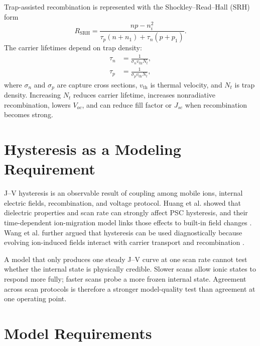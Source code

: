 Trap-assisted recombination is represented with the Shockley--Read--Hall (SRH)
form
\begin{equation}
R_{\mathrm{SRH}} =
\frac{np-n_i^2}
{\tau_p(n+n_1)+\tau_n(p+p_1)}.
\label{eq:srh}
\end{equation}
The carrier lifetimes depend on trap density:
\begin{align}
\tau_n &= \frac{1}{\sigma_n v_{\mathrm{th}} N_t},\\
\tau_p &= \frac{1}{\sigma_p v_{\mathrm{th}} N_t},
\end{align}
where $\sigma_n$ and $\sigma_p$ are capture cross sections, $v_{\mathrm{th}}$
is thermal velocity, and $N_t$ is trap density. Increasing $N_t$ reduces
carrier lifetime, increases nonradiative recombination, lowers $V_{oc}$, and
can reduce fill factor or $J_{sc}$ when recombination becomes strong.

\section{Hysteresis as a Modeling Requirement}

J--V hysteresis is an observable result of coupling among mobile ions, internal
electric fields, recombination, and voltage protocol. Huang et al. showed that
dielectric properties and scan rate can strongly affect PSC hysteresis, and
their time-dependent ion-migration model links those effects to built-in field
changes \cite{Huang_2022}. Wang et al. further argued that hysteresis can be
used diagnostically because evolving ion-induced fields interact with carrier
transport and recombination \cite{WangNatComm_2024}.

A model that only produces one steady J--V curve at one scan rate cannot test
whether the internal state is physically credible. Slower scans allow ionic
states to respond more fully; faster scans probe a more frozen internal state.
Agreement across scan protocols is therefore a stronger model-quality test than
agreement at one operating point.

\section{Model Requirements}

